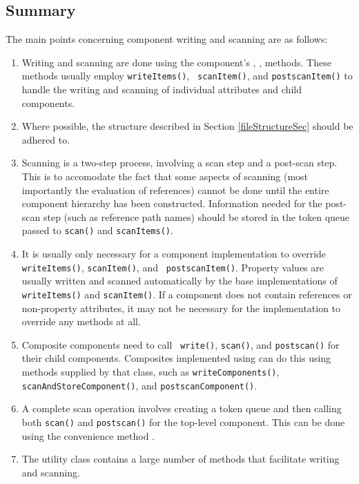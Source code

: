 \documentclass{article}
\begin{document}
\subsection{Summary}
\label{summarySec}

The main points concerning component writing and scanning are
as follows:

\begin{enumerate}

\item Writing and scanning are done using the component's
,
,
methods.  These methods usually employ {\tt writeItems()}, {\tt
scanItem()}, and {\tt postscanItem()} to handle the writing and
scanning of individual attributes and child components.

\item Where possible, the structure described in Section
\ref{fileStructureSec} should be adhered to. 

\item Scanning is a two-step process, involving a scan step and a
post-scan step. This is to accomodate the fact that some aspects of
scanning (most importantly the evaluation of references) cannot be
done until the entire component hierarchy has been constructed.
Information needed for the post-scan step (such as reference path
names) should be stored in the token queue passed to {\tt scan()} and
{\tt scanItems()}.

\item It is usually only necessary for a component implementation to
override {\tt writeItems()}, {\tt scanItem()}, and {\tt
postscanItem()}. Property values are usually written and scanned
automatically by the base implementations of {\tt writeItems()} and
{\tt scanItem()}. If a component does not contain references or
non-property attributes, it may not be necessary for the
implementation to override any methods at all.

\item Composite components need to call {\tt
write()}, {\tt scan()}, and {\tt postscan()} for their child
components. Composites implemented using
can do this using methods supplied by that class, such as
{\tt writeComponents()}, {\tt scanAndStoreComponent()}, 
and {\tt postscanComponent()}.

\item A complete scan operation involves creating
a token queue and then calling both {\tt scan()} and
{\tt postscan()} for the top-level component.
This can be done using the convenience method
.

\item The utility class
 contains a large
number of methods that facilitate writing and scanning.

\end{enumerate}
\end{document}
